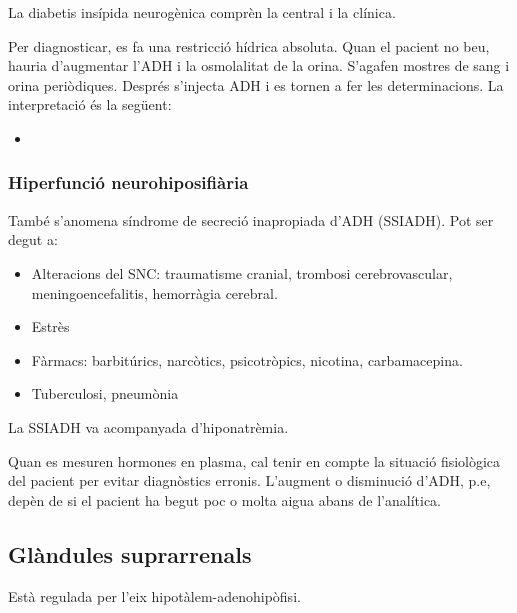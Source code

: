 La diabetis insípida neurogènica comprèn la central i la clínica.

Per diagnosticar, es fa una restricció hídrica absoluta. Quan el
pacient no beu, hauria d'augmentar l'ADH i la osmolalitat de la
orina. S'agafen mostres de sang i orina periòdiques. Després s'injecta
ADH i es tornen a fer les determinacions. La interpretació és la
següent:
\begin{itemize}
\item 
\end{itemize}

\subsubsection{Hiperfunció neurohiposifiària}
\label{sec:hiperf}
També s'anomena síndrome de secreció inapropiada d'ADH (SSIADH). Pot
ser degut a:
\begin{itemize}
\item Alteracions del SNC: traumatisme cranial, trombosi
  cerebrovascular, meningoencefalitis, hemorràgia cerebral.
\item Estrès
\item Fàrmacs: barbitúrics, narcòtics, psicotròpics, nicotina, carbamacepina.
\item Tuberculosi, pneumònia
\end{itemize}

La SSIADH va acompanyada d'hiponatrèmia.

Quan es mesuren hormones en plasma, cal tenir en compte la situació
fisiològica del pacient per evitar diagnòstics erronis. L'augment o
disminució d'ADH, p.e, depèn de si el pacient ha begut poc o molta
aigua abans de l'analítica.

\subsection{Glàndules suprarrenals}
\label{sec:gland-supr}

Està regulada per l'eix hipotàlem-adenohipòfisi. 

